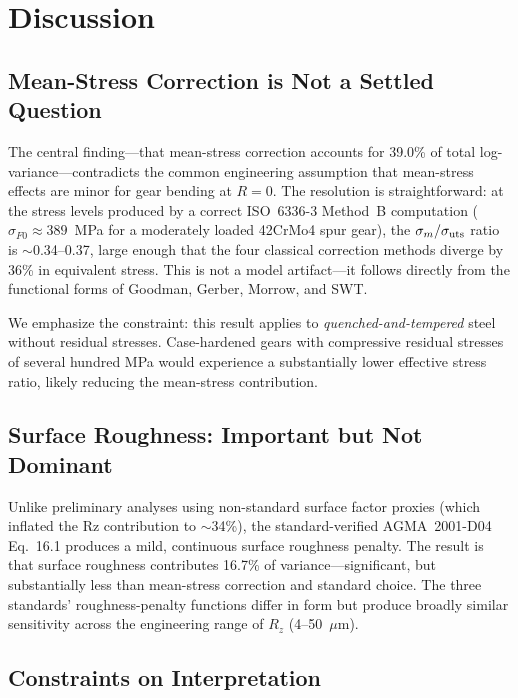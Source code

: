 \documentclass[12pt,a4paper]{article}
\begin{document}
\section{Discussion}
\label{sec:discussion}

\subsection{Mean-Stress Correction is Not a Settled Question}

The central finding---that mean-stress correction accounts for 39.0\% of
total log-variance---contradicts the common engineering assumption that
mean-stress effects are minor for gear bending at $R=0$. The resolution
is straightforward: at the stress levels produced by a correct
ISO~6336-3 Method~B computation ($\sigma_{F0} \approx 389$~MPa for a
moderately loaded 42CrMo4 spur gear), the $\sigma_m/\sigma_{\rm uts}$
ratio is $\sim$0.34--0.37, large enough that the four classical
correction methods diverge by 36\% in equivalent stress. This is not
a model artifact---it follows directly from the functional forms of
Goodman, Gerber, Morrow, and SWT.

We emphasize the constraint: this result applies to
\emph{quenched-and-tempered} steel without residual stresses.
Case-hardened gears with compressive residual stresses of several hundred
MPa would experience a substantially lower effective stress ratio,
likely reducing the mean-stress contribution.

\subsection{Surface Roughness: Important but Not Dominant}

Unlike preliminary analyses using non-standard surface factor proxies
(which inflated the Rz contribution to $\sim$34\%), the
standard-verified AGMA~2001-D04 Eq.~16.1 produces a mild, continuous
surface roughness penalty. The result is that surface roughness
contributes 16.7\% of variance---significant, but substantially less
than mean-stress correction and standard choice. The three standards'
roughness-penalty functions differ in form but produce broadly similar
sensitivity across the engineering range of $R_z$ (4--50~$\mu$m).

\subsection{Constraints on Interpretation}
\end{document}
